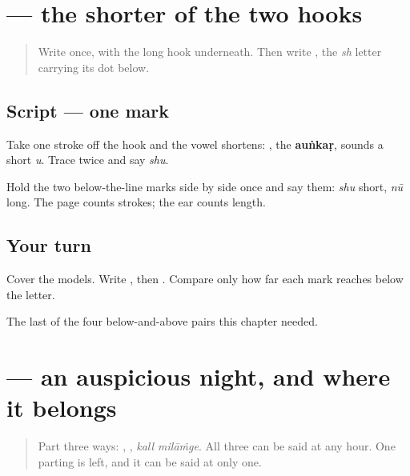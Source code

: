 \section[\texorpdfstring{\pa{ੁ} (u)}{ੁ (u)}]{ — the shorter of the two hooks}

\label{lesson:PA-W09-aunkar}



\begin{quote}
Write \textbf{} once, with the long hook underneath. Then write \textbf{}, the \emph{sh} letter carrying its dot below.
\end{quote}

\subsection*{Script — one mark}
Take one stroke off the hook and the vowel shortens: \textbf{}, the \textbf{auṅkaṛ}, sounds a short \emph{u}. Trace \textbf{} twice and say \emph{shu}.

Hold the two below-the-line marks side by side once and say them: \emph{shu} short, \emph{nū} long. The page counts strokes; the ear counts length.

\subsection*{Your turn}
Cover the models. Write \textbf{}, then \textbf{}. Compare only how far each mark reaches below the letter.

\begin{tcolorbox}[breakable,colback=teal!4,colframe=teal!35!black,title={Before you move on}]
The last of the four below-and-above pairs this chapter needed.
\end{tcolorbox}
\section[\texorpdfstring{\pa{ਸ਼ੁਭ} \pa{ਰਾਤ} (shubh rāt)}{ਸ਼ੁਭ ਰਾਤ (shubh rāt)}]{  — an auspicious night, and where it belongs}

\label{lesson:PA-C36-shubh-raat}



\begin{quote}
Part three ways: \textbf{ }, \textbf{ }, \emph{kall milāṁge}. All three can be said at any hour. One parting is left, and it can be said at only one.
\end{quote}

